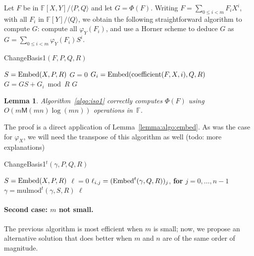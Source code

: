 \documentclass[12pt]{article}
\def\M {\ensuremath{\mathsf{M}}}
\def\F {\ensuremath{\mathbb{F}}}
\def\coeff {\ensuremath{\mathrm{coefficient}}}
\def\mulmod {\ensuremath{\mathrm{mulmod}}}
\newtheorem{Lemma}{Lemma}
\begin{document}
Let $F$ be in $\F[X,Y]/\langle P,Q\rangle$ and let
$G=\Phi(F)$. Writing $F=\sum_{0 \le i < m} F_i X^i$, with all $F_i$ in
$\F[Y]/\langle Q \rangle$, we obtain the following straightforward
algorithm to compute $G$: compute all $\varphi_Y(F_i)$, and use a
Horner scheme to deduce $G$ as $G=\sum_{0 \le i < m} \varphi_Y(F_i) S^i$.
\begin{algorithm}[H]
  \caption{ChangeBasis1$(F,P,Q,R)$}
  \begin{algorithmic}[1]
    \STATE $S={\rm Embed}(X,P,R)$
    \STATE $G=0$
    \STATE $G_i = {\rm Embed}(\coeff(F,X,i),Q,R)$
    \STATE $G = GS+G_i \bmod R$
    \ENDFOR
    \RETURN $G$
  \end{algorithmic}
  \label{algo:iso1}
\end{algorithm}

\begin{Lemma}
  Algorithm~\ref{algo:iso1} correctly computes $\Phi(F)$ using
  $O(m\M(mn)\log(mn))$ operations in~$\F$.
\end{Lemma}

The proof is a direct application of Lemma~\ref{lemma:algo:embed}.  As
was the case for $\varphi_X$, we will need the transpose of this
algorithm as well (todo: more explanations)
\begin{algorithm}[H]
  \caption{ChangeBasis1$^t(\gamma,P,Q,R)$}
  \begin{algorithmic}[1]
    \STATE $S={\rm Embed}(X,P,R)$
    \STATE $\ell=0$
    \STATE $\ell_{i,j} = ({\rm Embed}^t(\gamma,Q,R))_j$, {\bf for} $j=0,\dots,n-1$
    \STATE $\gamma = \mulmod^t(\gamma,S,R)$
    \ENDFOR
    \RETURN $\ell$
  \end{algorithmic}
  \label{algo:tiso1}
\end{algorithm}

\paragraph{Second case: $m$ not small.}
The previous algorithm is most efficient when $m$ is small; now, we
propose an alternative solution that does better when $m$ and $n$ are
of the same order of magnitude. 
\end{document}
